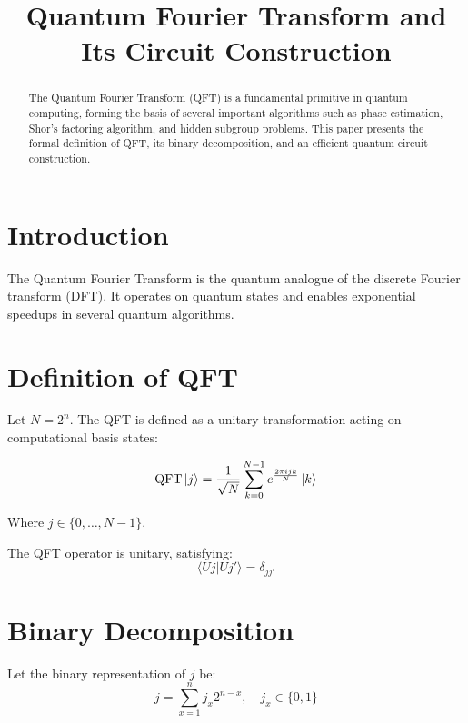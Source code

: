 \documentclass[conference]{IEEEtran}
\title{Quantum Fourier Transform and Its Circuit Construction}
\author{
\IEEEauthorblockN{}
\IEEEauthorblockA{}
}
\begin{document}
\maketitle

\begin{abstract}
The Quantum Fourier Transform (QFT) is a fundamental primitive in quantum computing, forming the basis of several important algorithms such as phase estimation, Shor's factoring algorithm, and hidden subgroup problems. This paper presents the formal definition of QFT, its binary decomposition, and an efficient quantum circuit construction.
\end{abstract}

\section{Introduction}\label{sec:introduction}

The Quantum Fourier Transform is the quantum analogue of the discrete Fourier transform (DFT). It operates on quantum states and enables exponential speedups in several quantum algorithms.

\section{Definition of QFT}\label{sec:definition-of-qft}

Let $N = 2^n$. The QFT is defined as a unitary transformation acting on computational basis states:

\begin{equation}
\mathrm{QFT}\ket{j} = \frac{1}{\sqrt{N}} \sum_{k=0}^{N-1} e^{\frac{2\pi i j k}{N}} \ket{k}\label{eq:equation}
\end{equation}

Where $j \in \{0, \dots, N-1\}$.

The QFT operator is unitary, satisfying:
\begin{equation}
\langle Uj | Uj' \rangle = \delta_{jj'}\label{eq:equation2}
\end{equation}

\section{Binary Decomposition}

Let the binary representation of $j$ be:
\begin{equation}
j = \sum_{x=1}^{n} j_x 2^{n-x}, \quad j_x \in \{0,1\}\label{eq:equation3}
\end{equation}
\end{document}
